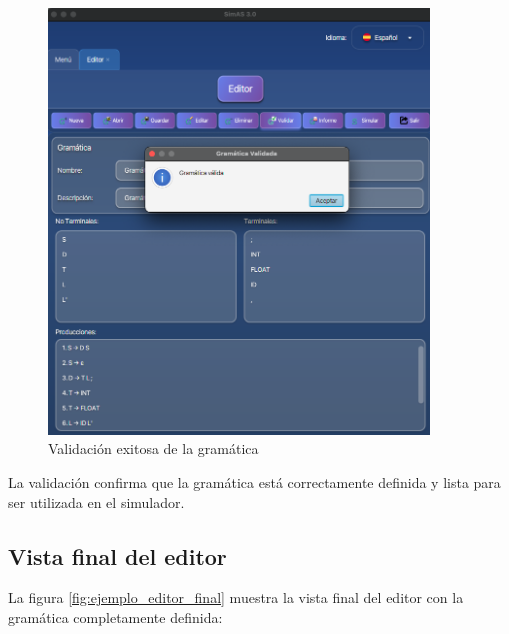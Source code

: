 \needspace{8cm}
\begin{figure}[H]
    \centering
    \includegraphics[width=0.9\textwidth]{figuras/ejemplo_practico/editor_validar.png}
    \caption{Validación exitosa de la gramática}
    \label{fig:ejemplo_editor_validar}
\end{figure}

La validación confirma que la gramática está correctamente definida y lista para ser utilizada en el simulador.

\subsection{Vista final del editor}

La figura \ref{fig:ejemplo_editor_final} muestra la vista final del editor con la gramática completamente definida:

